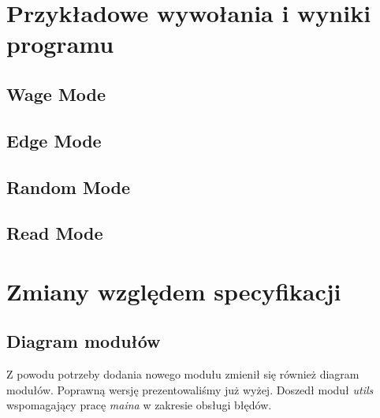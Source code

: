 \documentclass[10pt, a4paper]{report}
\begin{document}
    \section{Przykładowe wywołania i wyniki programu}

    \subsection{Wage Mode}

    \subsection{Edge Mode}

    \subsection{Random Mode}

    \subsection{Read Mode}

    \section{Zmiany względem specyfikacji}

    \subsection{Diagram modułów}
    Z powodu potrzeby dodania nowego modułu zmienił się również diagram modułów. Poprawną wersję prezentowaliśmy już wyżej.
    Doszedł moduł \textit{utils} wspomagający pracę \textit{maina} w zakresie obsługi błędów.
\end{document}
